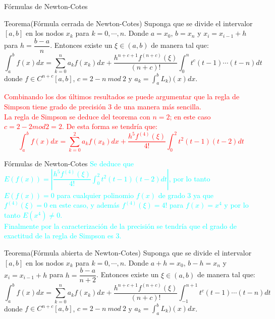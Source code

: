 \begin{frame}{Fórmulas de Newton-Cotes}
\small
\begin{block}{Teorema(Fórmula cerrada de Newton-Cotes)}
Suponga que se divide el intervalor $[a,b]$ en los nodos $x_k$ para $k=0,\cdots, n$. Donde $a=x_0$, $b=x_n$ y $x_i=x_{i-1}+h$ para $h=\dfrac{b-a}{n}$. Entonces existe un $\xi\in(a,b)$ de manera tal que:
$$\int_a^b f(x)dx=\sum_{k=0}^{n}a_kf(x_k)dx+\dfrac{h^{n+c+1}f^{(n+c)}(\xi)}{(n+c)!}\int_{0}^{n}t^c(t-1)\cdots(t-n)dt$$
donde $f\in C^{n+c}[a,b]$, $c=2-n\ mod\ 2$ y $\displaystyle a_k=\int_{a}^{b}L_k)(x)dx$.
\end{block}\pause
\textcolor{red}{Combinando los dos últimos resultados se puede argumentar que la regla de Simpson tiene grado de precisión 3 de una manera más sencilla.\\\pause
La regla de Simpson se deduce del teorema con $n=2$; en este caso $c=2-2mod2=2$. De esta forma se tendría que:\\\pause
$$\int_a^b f(x)dx=\sum_{k=0}^{2}a_kf(x_k)dx+\dfrac{h^{5}f^{(4)}(\xi)}{4!}\int_{0}^{2}t^2(t-1)(t-2)dt$$}\pause
\end{frame}
\begin{frame}{Fórmulas de Newton-Cotes}
\small
\textcolor{cyan}{Se deduce que $E(f(x))=|\dfrac{h^{5}f^{(4)}(\xi)}{4!}\int_{0}^{2}t^2(t-1)(t-2)dt|$, por lo tanto $E(f(x))=0$ para cualquier polinomio $f(x)$ de grado 3 ya que $f^{(4)}(\xi)=0$ en este caso, y además $f^{(4)}(\xi)=4!$ para $f(x)=x^4$ y por lo tanto $E(x^4)\neq 0$.}\\
\textcolor{cyan}{Finalmente por la caracterización de la precisión se tendría que el grado de exactitud de la regla de Simpson es 3.}\pause
\begin{block}{Teorema(Fórmula abierta de Newton-Cotes)}
Suponga que se divide el intervalor $[a,b]$ en los nodos $x_k$ para $k=0,\cdots, n$. Donde $a+h=x_0$, $b-h=x_n$ y $x_i=x_{i-1}+h$ para $h=\dfrac{b-a}{n+2}$. Entonces existe un $\xi\in(a,b)$ de manera tal que:
$$\int_a^b f(x)dx=\sum_{k=0}^{n}a_kf(x_k)dx+\dfrac{h^{n+c+1}f^{(n+c)}(\xi)}{(n+c)!}\int_{-1}^{n+1}t^c(t-1)\cdots(t-n)dt$$
donde $f\in C^{n+c}[a,b]$, $c=2-n\ mod\ 2$ y $\displaystyle a_k=\int_{a}^{b}L_k)(x)dx$.
\end{block}
\end{frame}